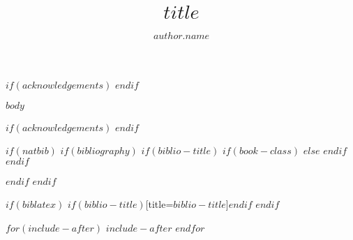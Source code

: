 \documentclass[a4paper,$if(fontsize)$$fontsize$,$else$12pt,$endif$$if(one_column)$$if(lineno)$lineno,$endif$$else$twocolumn,$endif$$if(one_sided)$$else$twoside,$endif$printwatermark=$if(watermark)$$watermark$$else$false$endif$]{modeloLEA}
\title{$title$}
\author[$author.affiliation$]{$author.name$}
\affil[$address.code$]{$address.address$}
\numberwithin{equation}{section}
\numberwithin{figure}{section}
\numberwithin{table}{section}
\begin{document}
\verticaladjustment{-2pt}

\maketitle
\thispagestyle{firststyle}


$if(acknowledgements)$
$endif$

$body$

$if(acknowledgements)$
\showacknow
$endif$

\pnasbreak 

$if(natbib)$
$if(bibliography)$
$if(biblio-title)$
$if(book-class)$
\renewcommand\bibname{$biblio-title$}
$else$
\renewcommand\refname{$biblio-title$}
$endif$
$endif$


$endif$
$endif$

$if(biblatex)$
\printbibliography$if(biblio-title)$[title=$biblio-title$]$endif$
$endif$

$for(include-after)$
$include-after$
$endfor$
\end{document}
